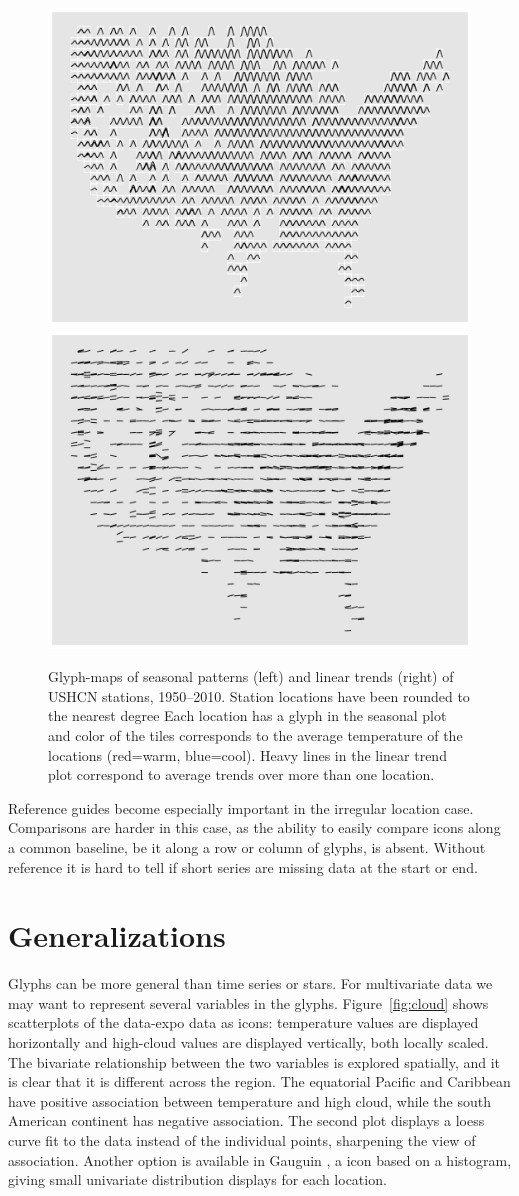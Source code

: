\documentclass[oneside]{article}
\begin{document}
\begin{figure}[htbp]
  \centering
  \includegraphics[width=0.5\linewidth]{usa-season-grid}%
  \includegraphics[width=0.5\linewidth]{usa-lin-grid}%
  \caption{Glyph-maps of seasonal patterns (left) and linear trends (right) of USHCN stations, 1950--2010.  Station locations have been rounded to the nearest degree Each location has a glyph in the seasonal plot and color of the tiles corresponds to the average temperature of the locations (red=warm, blue=cool).  Heavy lines in the linear trend plot correspond to average trends over more than one location.}
  \label{fig:irregular-grid}
\end{figure}

Reference guides become especially important in the irregular location case. Comparisons are harder in this case, as the ability to easily compare icons along a common baseline, be it along a row or column of glyphs, is absent. Without reference it is hard to tell if short series are missing data at the start or end.  

\section{Generalizations}

Glyphs can be more general than time series or stars. For multivariate data we may want to represent several variables in the glyphs. Figure~\ref{fig:cloud} shows scatterplots of the data-expo data as icons: temperature values are displayed horizontally and high-cloud values are displayed vertically, both locally scaled. The bivariate relationship between the two variables is explored spatially, and it is clear that it is different across the region. The equatorial Pacific and Caribbean have positive association between temperature and high cloud, while the south American continent has negative association. The second plot displays a loess curve fit to the data instead of the individual points, sharpening the view of association. Another option is available in Gauguin \citep{gribov:2006}, a icon based on a histogram, giving small univariate distribution displays for each location.
\end{document}
